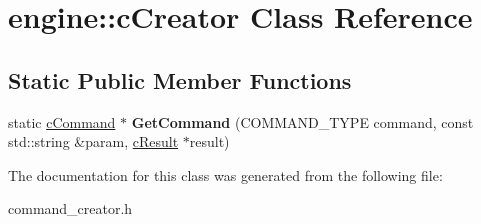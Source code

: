 \hypertarget{classengine_1_1cCreator}{
\section{engine\-:\-:c\-Creator \-Class \-Reference}
\label{classengine_1_1cCreator}
}
\subsection*{\-Static \-Public \-Member \-Functions}
\begin{DoxyCompactItemize}
\item 
\hypertarget{classengine_1_1cCreator_a67c7b575c0a32a48bb2428d263ccd3e0}{
static \hyperlink{classengine_1_1cCommand}{c\-Command} $\ast$ {\bfseries \-Get\-Command} (\-C\-O\-M\-M\-A\-N\-D\-\_\-\-T\-Y\-P\-E command, const std\-::string \&param, \hyperlink{classengine_1_1cResult}{c\-Result} $\ast$result)}
\label{classengine_1_1cCreator_a67c7b575c0a32a48bb2428d263ccd3e0}

\end{DoxyCompactItemize}


\-The documentation for this class was generated from the following file\-:\begin{DoxyCompactItemize}
\item 
command\-\_\-creator.\-h\end{DoxyCompactItemize}
